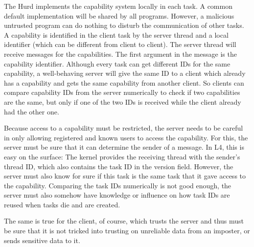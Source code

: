 The Hurd implements the capability system locally in each task.  A
common default implementation will be shared by all programs.
However, a malicious untrusted program can do nothing to disturb the
communication of other tasks.  A capability is identified in the
client task by the server thread and a local identifier (which can be
different from client to client).  The server thread will receive
messages for the capabilities.  The first argument in the message is
the capability identifier.  Although every task can get different IDs
for the same capability, a well-behaving server will give the same ID
to a client which already has a capability and gets the same
capability from another client.  So clients can compare capability IDs
from the server numerically to check if two capabilities are the same,
but only if one of the two IDs is received while the client already
had the other one.

Because access to a capability must be restricted, the server needs to
be careful in only allowing registered and known users to access the
capability.  For this, the server must be sure that it can determine
the sender of a message.  In L4, this is easy on the surface: The
kernel provides the receiving thread with the sender's thread ID,
which also contains the task ID in the version field.  However, the
server must also know for sure if this task is the same task that it
gave access to the capability.  Comparing the task IDs numerically is
not good enough, the server must also somehow have knowledge or
influence on how task IDs are reused when tasks die and are created.

The same is true for the client, of course, which trusts the server
and thus must be sure that it is not tricked into trusting on
unreliable data from an imposter, or sends sensitive data to it.

\begin{comment}
  The \texttt{task} server wants to reuse thread numbers because that
  makes best use of kernel memory.  Reusing task IDs, the version
  field of a thread ID, is not so important, but there are only 14
  bits for the version field (and the lower six bits must not be all
  zero).  So a thread ID is bound to be reused eventually.
  
  Using the version field in a thread ID as a generation number is not
  good enough, because it is so small.  Even on 64-bit architectures,
  where it is 32 bit long, it can eventually overflow.
\end{comment}

